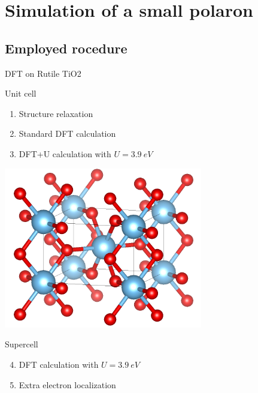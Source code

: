 \documentclass[11pt, xcolor=dvipsnames, aspectratio=43]{beamer}
\begin{document}
\section{Simulation of a small polaron}
\subsection{Employed rocedure}
\begin{frame}{DFT on Rutile TiO2}{}

    \alert{Unit cell} \\
    \begin{minipage}[]{0.49\linewidth}
        \begin{enumerate}
            \item Structure relaxation
            \item Standard DFT calculation
            \item DFT+U calculation with $U = \SI{3.9}{eV}$
        \end{enumerate}
    \end{minipage}
    \begin{minipage}{0.49\linewidth}
        \centering
        \includegraphics[width=0.65\textwidth]{figures/rutile.png}
    \end{minipage}
    \pause
    \alert{Supercell} \\
    \begin{minipage}[]{0.49\linewidth}
        \begin{enumerate}
            \setcounter{enumi}{3}
            \item DFT calculation with $U = \SI{3.9}{eV}$
            \item Extra electron localization
        \end{enumerate}
    \end{minipage}
    \begin{minipage}{0.49\linewidth}

\end{minipage}
\end{frame}
\end{document}
